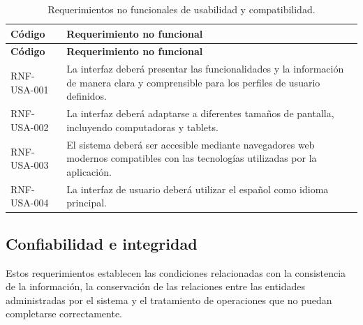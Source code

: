 \begin{longtable}{|p{}|p{}|}
    \caption{Requerimientos no funcionales de usabilidad y compatibilidad.}
    \label{tab:rnf-usabilidad}\\
    \hline
    \textbf{Código} & \textbf{Requerimiento no funcional} \\
    \hline
    \endfirsthead

    \hline
    \textbf{Código} & \textbf{Requerimiento no funcional} \\
    \hline
    \endhead

    RNF-USA-001 &
    La interfaz deberá presentar las funcionalidades y la información de
    manera clara y comprensible para los perfiles de usuario definidos. \\
    \hline

    RNF-USA-002 &
    La interfaz deberá adaptarse a diferentes tamaños de pantalla, incluyendo
    computadoras y tablets. \\
    \hline

    RNF-USA-003 &
    El sistema deberá ser accesible mediante navegadores web modernos
    compatibles con las tecnologías utilizadas por la aplicación. \\
    \hline

    RNF-USA-004 &
    La interfaz de usuario deberá utilizar el español como idioma principal. \\
    \hline
\end{longtable}


\subsection{Confiabilidad e integridad}
\label{subsec:rnf-confiabilidad}

Estos requerimientos establecen las condiciones relacionadas con la
consistencia de la información, la conservación de las relaciones entre las
entidades administradas por el sistema y el tratamiento de operaciones que no
puedan completarse correctamente.

